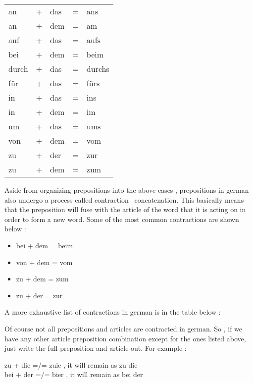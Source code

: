 \documentclass[a4paper,twocolumn,10pt]{article}
\newcommand{\newpar}
{\par \vspace{0.3cm}}
\newcommand{\tabularxtable}[3]
{

	\vspace{0.5cm}
	\nolinenumbers

	\begin{tabularx}{#1}{#2}
		#3
	\end{tabularx}

	\linenumbers
	\vspace{0.5cm}
}
\begin{document}
\tabularxtable
{0.95\linewidth}
{llllX}
{

an    & + & das & = & ans \\
an    & + & dem & = & am\\
auf   & + & das & = & aufs\\
bei   & + & dem & = & beim\\
durch & + & das & = & durchs\\
für   & + & das & = & fürs\\
in    & + & das & = & ins\\
in    & + & dem & = & im\\
um    & + & das & = & ums\\
von   & + & dem & = & vom\\
zu    & + & der & = & zur\\
zu    & + & dem & = & zum\\



}


Aside from organizing prepositions into the above cases , prepositions in german
also undergo a process called contraction \ concatenation. This basically means
that the preposition will fuse with the article of the word that it is acting on
in order to form a new word. Some of the most common contractions are shown
below : \newpar


\begin{itemize}[noitemsep]

	\item bei + dem = beim
	\item von + dem = vom
	\item zu + dem = zum
	\item zu + der = zur

\end{itemize}


A more exhaustive list of contractions in german is in the table below :\newpar

Of course not all prepositions and articles are contracted in german. So , if we
have any other article preposition combination except for the ones listed above,
just write the full preposition and article out. For example :\newpar

zu + die =/=  zuie , it will remain as zu die\\
bei + der =/= bier , it will remain as bei der\\
\end{document}
